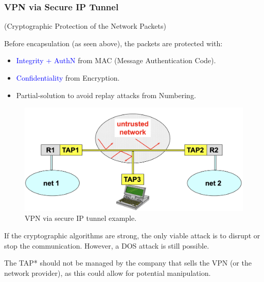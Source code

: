 \subsubsection{VPN via Secure IP Tunnel}
\begin{center}
    (Cryptographic Protection of the Network Packets)
\end{center}
\begin{multicols}{2}

\raggedcolumns
    Before encapsulation (as seen above), the packets are protected with:
    \begin{itemize}
        \item \textcolor{Blue}{Integrity + AuthN} from MAC (Message Authentication Code).
        \item \textcolor{Blue}{Confidentiality} from Encryption.
        \item Partial-solution to avoid replay attacks from Numbering.
    \end{itemize}
\columnbreak

\begin{figure}[H]
    \centering
    \includegraphics[width=\linewidth]{Images/NetSec/vpn_via_encrypt_tunnel.png}
    \caption{VPN via secure IP tunnel example.}    
\end{figure}
\end{multicols}






\begin{tcolorbox}[colback=blue!10!white, colframe=blue!50!white, title=How to Damage the Communication?] 
    If the cryptographic algorithms are strong, the only viable attack is to disrupt or stop the communication. However, a DOS attack is still possible.
\end{tcolorbox}



\begin{tcolorbox}[colback=red!10!white, colframe=red!70!black, coltitle=white, title=Be aware] 
    The TAP* should not be managed by the company that sells the VPN (or the network provider), as this could allow for potential manipulation.
\end{tcolorbox}

